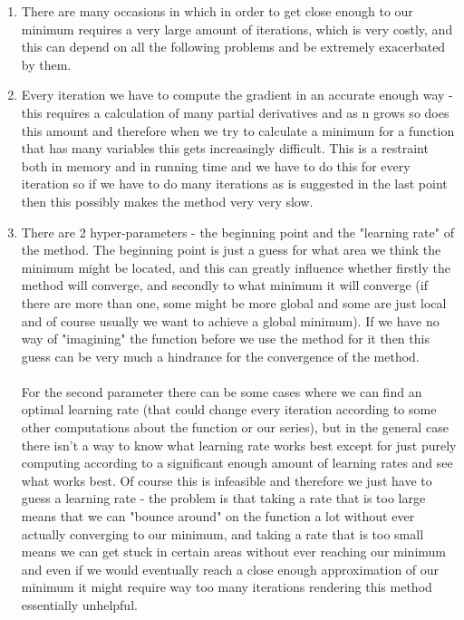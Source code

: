 \documentclass{article}
\begin{document}
\begin{enumerate}
    \item There are many occasions in which in order to get close enough to our minimum requires a very large amount of iterations, which is very costly, and this can depend on all the following problems and be extremely exacerbated by them.
    \item Every iteration we have to compute the gradient in an accurate enough way - this requires a calculation of many partial derivatives and as n grows so does this amount and therefore when we try to calculate a minimum for a function that has many variables this gets increasingly difficult. This is a restraint both in memory and in running time and we have to do this for every iteration so if we have to do many iterations as is suggested in the last point then this possibly makes the method very very slow.
    \item There are 2 hyper-parameters - the beginning point and the "learning rate" of the method. The beginning point is just a guess for what area we think the minimum might be located, and this can greatly influence whether firstly the method will converge, and secondly to what minimum it will converge (if there are more than one, some might be more global and some are just local and of course usually we want to achieve a global minimum). If we have no way of "imagining" the function before we use the method for it then this guess can be very much a hindrance for the convergence of the method.  \\ \\For the second parameter there can be some cases where we can find an optimal learning rate (that could change every iteration according to some other computations about the function or our series), but in the general case there isn't a way to know what learning rate works best except for just purely computing according to a significant enough amount of learning rates and see what works best. Of course this is infeasible and therefore  we just have to guess a learning rate - the problem is that taking a rate that is too large means that we can "bounce around" on the function a lot without ever actually converging to our minimum, and taking a rate that is too small means we can get stuck in certain areas without ever reaching our minimum and even if we would eventually reach a close enough approximation of our minimum it might require way too many iterations rendering this method essentially unhelpful. 
\end{enumerate}
\end{document}
